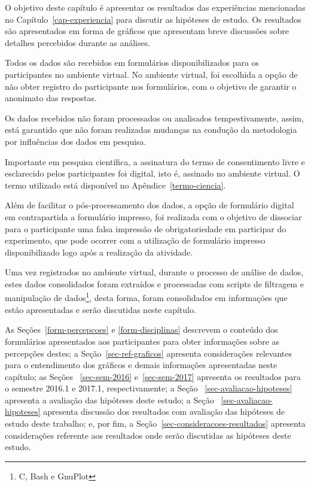 

\label{cap-resultados}
\acresetall

O objetivo deste capítulo é apresentar os resultados das experiências
mencionadas no Capítulo~\ref{cap-experiencia} para discutir as
hipóteses de estudo.
Os resultados são apresentados em forma de gráficos que apresentam
breve discussões sobre detalhes percebidos durante as análises.

Todos os dados são recebidos em formulários
disponibilizados para os participantes no ambiente virtual.
No ambiente virtual, foi escolhida a opção de não
obter registro do participante nos formulários, com o objetivo
de garantir o anonimato das respostas.

Os dados recebidos não foram processados ou analisados
tempestivamente, assim, está garantido que não foram
realizadas mudanças na condução da metodologia
por influências dos dados em pesquisa.

Importante em pesquisa científica, a assinatura do termo
de consentimento livre e esclarecido pelos participantes foi digital,
isto é, assinado no ambiente virtual.
O termo utilizado está disponível no Apêndice~\ref{termo-ciencia}.

Além de facilitar o pós-processamento dos dados, a opção de
formulário digital em contrapartida a formulário impresso, foi
realizada com o objetivo de dissociar para o participante
uma falsa impressão de obrigatoriedade em participar do experimento,
que pode ocorrer com a utilização de formulário impresso disponibilizado
logo após a realização da atividade.


Uma vez registrados no ambiente virtual, durante o processo de análise de dados,
estes dados consolidados foram extraídos e processadas com scripts de filtragem
e manipulação de dados\footnote{C, Bash e GnuPlot}, desta forma, foram consolidados em informações que estão
apresentadas e serão discutidas neste capítulo.

As Seções~\ref{form-percepcoes} e \ref{form-disciplinas} descrevem
o conteúdo dos formulários apresentados aos participantes para obter
informações sobre as percepções destes;
a Seção~\ref{sec-ref-graficos} apresenta considerações relevantes para o
entendimento dos gráficos e demais informações apresentadas neste capítulo;
as Seções ~\ref{sec-sem-2016} e~\ref{sec-sem-2017}
apresenta os resultados para o semestre 2016.1 e 2017.1, respectivamente;
a Seção ~\ref{sec-avaliacao-hipoteses} apresenta a avaliação das
hipóteses deste estudo;
a Seção ~\ref{sec-avaliacao-hipoteses} apresenta discussão dos resultados
com avaliação das hipóteses de estudo deste trabalho;
e, por fim, a Seção~\ref{sec-consideracoes-resultados} apresenta
considerações referente aos resultados onde serão discutidas
as hipóteses deste estudo.

